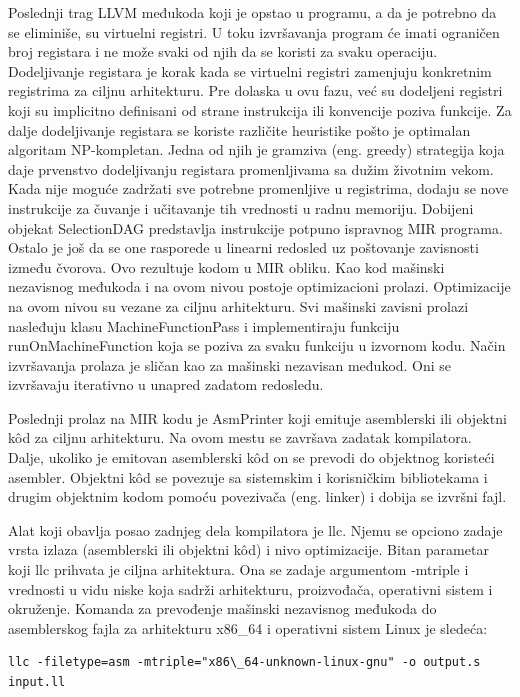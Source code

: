 \documentclass[12pt,oneside]{memoir}
\begin{document}
Poslednji trag LLVM međukoda koji je opstao u programu, a da je potrebno da
se eliminiše, su virtuelni registri. U toku izvršavanja program će imati ograničen
broj registara i ne može svaki od njih da se koristi za svaku operaciju. Dodeljivanje
registara je korak kada se virtuelni registri zamenjuju konkretnim registrima za ciljnu arhitekturu. Pre dolaska u ovu fazu, već su dodeljeni registri koji su implicitno
definisani od strane instrukcija ili konvencije poziva funkcije. Za dalje dodeljivanje
registara se koriste različite heuristike pošto je optimalan algoritam NP-kompletan. Jedna od njih je gramziva (eng. greedy) strategija koja daje prvenstvo dodeljivanju registara promenljivama sa dužim životnim vekom. Kada nije moguće zadržati
sve potrebne promenljive u registrima, dodaju se nove instrukcije za čuvanje i učitavanje tih vrednosti u radnu memoriju.
Dobijeni objekat SelectionDAG predstavlja instrukcije potpuno ispravnog MIR
programa. Ostalo je još da se one rasporede u linearni redosled uz poštovanje zavisnosti između čvorova. Ovo rezultuje kodom u MIR obliku.
Kao kod mašinski nezavisnog međukoda i na ovom nivou postoje optimizacioni
prolazi. Optimizacije na ovom nivou su vezane za ciljnu arhitekturu. Svi mašinski zavisni prolazi nasleđuju klasu MachineFunctionPass i implementiraju funkciju
runOnMachineFunction koja se poziva za svaku funkciju u izvornom kodu. Način
izvršavanja prolaza je sličan kao za mašinski nezavisan međukod. Oni se izvršavaju
iterativno u unapred zadatom redosledu.

Poslednji prolaz na MIR kodu je AsmPrinter koji emituje asemblerski ili objektni kôd za ciljnu arhitekturu. Na ovom mestu se završava zadatak kompilatora. Dalje,
ukoliko je emitovan asemblerski kôd on se prevodi do objektnog koristeći asembler.
Objektni kôd se povezuje sa sistemskim i korisničkim bibliotekama i drugim objektnim kodom pomoću povezivača (eng. linker) i dobija se izvršni fajl.

Alat koji obavlja posao zadnjeg dela kompilatora je llc. Njemu se opciono zadaje
vrsta izlaza (asemblerski ili objektni kôd) i nivo optimizacije. Bitan parametar koji
llc prihvata je ciljna arhitektura. Ona se zadaje argumentom -mtriple i vrednosti
u vidu niske koja sadrži arhitekturu, proizvođača, operativni sistem i okruženje.
Komanda za prevođenje mašinski nezavisnog međukoda do asemblerskog fajla za
arhitekturu x86\_64 i operativni sistem Linux je sledeća:
\begin{verbatim}
llc -filetype=asm -mtriple="x86\_64-unknown-linux-gnu" -o output.s input.ll
\end{verbatim}
\end{document}
